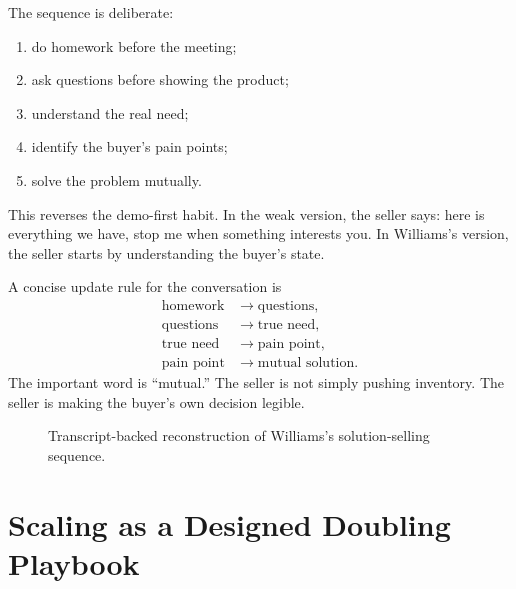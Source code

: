 The sequence is deliberate:
\begin{enumerate}
\item do homework before the meeting;
\item ask questions before showing the product;
\item understand the real need;
\item identify the buyer's pain points;
\item solve the problem mutually.
\end{enumerate}
This reverses the demo-first habit. In the weak version, the seller says: here is everything we have, stop me when something interests you. In Williams's version, the seller starts by understanding the buyer's state.

A concise update rule for the conversation is
\begin{align}
\text{homework}
&\longrightarrow
\text{questions},\\
\text{questions}
&\longrightarrow
\text{true need},\\
\text{true need}
&\longrightarrow
\text{pain point},\\
\text{pain point}
&\longrightarrow
\text{mutual solution}.
\end{align}
The important word is ``mutual.'' The seller is not simply pushing inventory. The seller is making the buyer's own decision legible.

\begin{figure}
\centering
{}
\caption{Transcript-backed reconstruction of Williams's solution-selling sequence.}
\end{figure}

\section{Scaling as a Designed Doubling Playbook}

